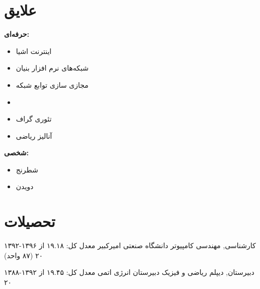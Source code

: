 \documentclass[]{friggeri-cv-fa} %
\begin{document}

\section{علایق}
\textbf{حرفه‌ای:}
\begin{itemize}
	\item اینترنت اشیا
	\item شبکه‌های نرم افزار بنیان
	\item مجازی سازی توابع شبکه
	\item {}
	\item تئوری گراف
	\item آنالیز ریاضی
\end{itemize}
\textbf{شخصی:}
\begin{itemize}	
	\item شطرنج
	\item دویدن
\end{itemize}



\section{تحصیلات}

\begin{entrylist}


	\entry
	{۱۳۹۲-۱۳۹۶}
	{کارشناسی, {\normalfont مهندسی کامپیوتر}}
	{دانشگاه صنعتی امیرکبیر}
	{معدل کل: ۱۹.۱۸ از ۲۰ (۸۷ واحد)}


	\entry
	{۱۳۸۸-۱۳۹۲}
	{دبیرستان, {\normalfont دیپلم ریاضی و فیزیک}}
	{دبیرستان انرژی اتمی}
	{معدل کل: ۱۹.۴۵ از ۲۰}



\end{entrylist}

\end{document}
